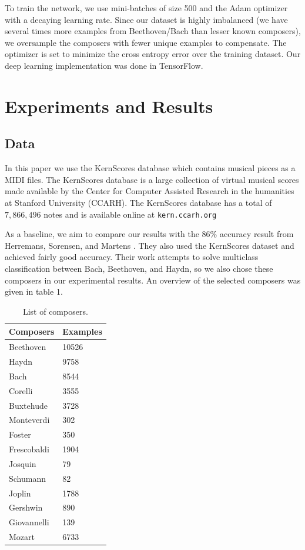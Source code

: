 \documentclass[11pt,a4paper]{article}
\begin{document}
To train the network, we use mini-batches of size 500 and the Adam optimizer with a decaying learning rate. Since our dataset is highly imbalanced (we have several times more examples from Beethoven/Bach than lesser known composers), we oversample the composers with fewer unique examples to compensate. The optimizer is set to minimize the cross entropy error over the training dataset. Our deep learning implementation was done in TensorFlow.


\section{Experiments and Results}

\subsection{Data}
In this paper we use the KernScores database which contains musical pieces as a MIDI files. The KernScores database is a large collection of virtual musical scores made available by the Center for Computer Assisted Research in the humanities at Stanford University (CCARH). The KernScores database has a total of $7,866,496$ notes and is available online at \texttt{kern.ccarh.org} 

As a baseline, we aim to compare our results with the 86\% accuracy result from Herremans, Sorensen, and Martens \cite {Herremans}. They also used the KernScores dataset and achieved fairly good accuracy. Their work attempts to solve multiclass classification between Bach, Beethoven, and Haydn, so we also chose these composers in our experimental results. An overview of the selected composers was given in table 1.

\begin{table}[t!]
\begin{center}
\begin{tabular}{|l|l|}
\hline \bf Composers & \bf Examples \\ \hline
Beethoven & 10526 \\
Haydn & 9758 \\
Bach & 8544\\
Corelli & 3555\\
Buxtehude & 3728\\
Monteverdi & 302 \\
Foster & 350\\
Frescobaldi & 1904\\
Josquin & 79\\
Schumann & 82\\
Joplin & 1788\\
Gershwin & 890\\
Giovannelli & 139\\
Mozart & 6733  \\
\hline
\end{tabular}
\end{center}
\caption{\label{composer-table}List of composers. }
\end{table}
\end{document}
